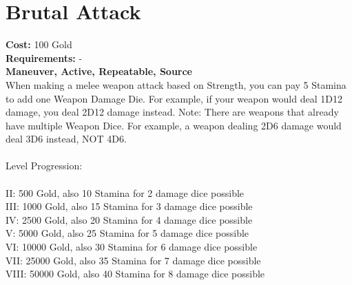 \section*{Brutal Attack}
\textbf{Cost:} 100 Gold\\
\textbf{Requirements:} -\\
\textbf{Maneuver, Active, Repeatable, Source}\\
When making a melee weapon attack based on Strength, you can pay 5 Stamina to add one Weapon Damage Die. For example, if your weapon would deal 1D12 damage, you deal 2D12 damage instead. Note: There are weapons that already have multiple Weapon Dice. For example, a weapon dealing 2D6 damage would deal 3D6 instead, NOT 4D6.\\
\\
Level Progression:\\
\\
II: 500 Gold, also 10 Stamina for 2 damage dice possible\\
III: 1000 Gold, also 15 Stamina for 3 damage dice possible\\
IV: 2500 Gold, also 20 Stamina for 4 damage dice possible\\
V: 5000 Gold, also 25 Stamina for 5 damage dice possible\\
VI: 10000 Gold, also 30 Stamina for 6 damage dice possible\\
VII: 25000 Gold, also 35 Stamina for 7 damage dice possible\\
VIII: 50000 Gold, also 40 Stamina for 8 damage dice possible\\
